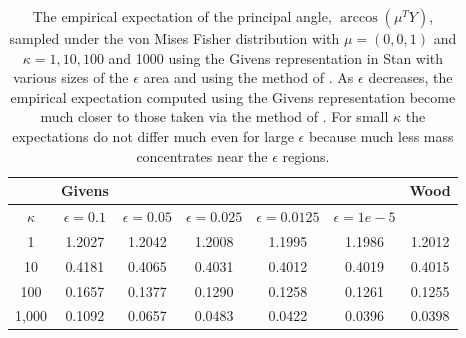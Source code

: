 \documentclass[ba]{imsart}
\numberwithin{equation}{section}
\theoremstyle{plain}
\begin{document}
\begin{table}
\begin{tabular}{|c||ccccc|c|}
\hline
 &   Givens &  &  &  & & Wood\\
\hline
$\kappa$ & $\epsilon = 0.1$ & $\epsilon = 0.05$ & $\epsilon = 0.025$ & $\epsilon = 0.0125$ & $\epsilon = 1e-5$ & \\
\hline
\hline
1 & 1.2027 & 1.2042 & 1.2008 & 1.1995 & 1.1986 & 1.2012\\
10 & 0.4181 & 0.4065 & 0.4031 & 0.4012 & 0.4019 & 0.4015\\
100 & 0.1657 & 0.1377 & 0.1290 & 0.1258 & 0.1261 & 0.1255 \\
1,000 & 0.1092 & 0.0657 & 0.0483 & 0.0422 & 0.0396 & 0.0398\\
\hline
\end{tabular}
\caption{The empirical expectation of the principal angle, $\arccos (\mu^T Y)$, sampled under the von Mises Fisher distribution with $\mu = (0,0,1)$ and $\kappa = 1, 10, 100$ and 1000 using the Givens representation in Stan with various sizes of the $\epsilon$ area and using the method of \citet{wood1994simulation}. As $\epsilon$ decreases, the empirical expectation computed using the Givens representation become much closer to those taken via the method of \citet{wood1994simulation}. For small $\kappa$ the expectations do not differ much even for large $\epsilon$ because much less mass concentrates near the $\epsilon$ regions.}
\label{tab:vmf_epsilon_region_expectations}
\end{table}

\end{document}
